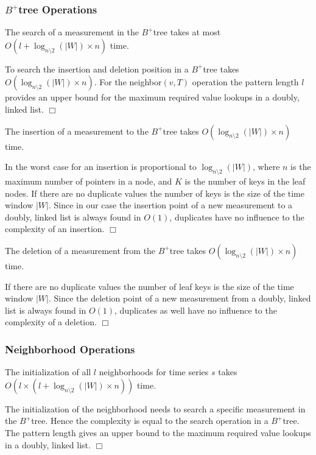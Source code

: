 \documentclass[abstracton,12pt]{scrreprt}
\newenvironment{proof}
  {\noindent{\bf Proof:\rm}}{\hfill$\Box$\vspace{\medskipamount}}
\begin{document}
\subsubsection{$B^+$tree Operations}
\begin{mydef}
	The search of a measurement in the $B^+$tree takes at most $O(l + \log_{n\setminus2}(|W|) \times n)$ time.
\end{mydef}
\begin{proof}
	To search the insertion and deletion position in a $B^+$tree takes $O(\log_{n\setminus2}(|W|) \times n)$. For the neighbor$(v,T)$ operation the pattern length $l$ provides an upper bound for the maximum required value lookups in a doubly, linked list.
\end{proof}

\begin{mydef}
	The insertion of a measurement to the $B^+$tree takes $O(\log_{n\setminus2}(|W|) \times n)$ time.
\end{mydef}
\begin{proof}
	In the worst case for an insertion is proportional to $\log_{n\setminus2}(|W|)$, where $n$ is the maximum number of pointers in a node, and $K$ is the number of keys in the leaf nodes. If there are no duplicate values the number of keys is the size of the time window $|W|$. Since in our case the insertion point of a new measurement to a doubly, linked list is always found in $O(1)$, duplicates have no influence to the complexity of an insertion.  
\end{proof}
\begin{mydef}
	The deletion of a measurement from the $B^+$tree takes $O(\log_{n\setminus2}(|W|) \times n)$ time.
\end{mydef}
\begin{proof}
	 If there are no duplicate values the number of leaf keys is the size of the time window $|W|$. Since the deletion point of a new measurement from a doubly, linked list is always found in $O(1)$, duplicates as well have no influence to the complexity of a deletion. 
\end{proof}


\subsubsection{Neighborhood Operations}
\begin{mydef}
	The initialization of all $l$ neighborhoods for time series $s$ takes  $O(l \times(l+\log_{n\setminus2}(|W|) \times n))$ time.
\end{mydef}
\begin{proof}
	The initialization of the neighborhood needs to search a specific measurement in the $B^+$tree. Hence the complexity is equal to the search operation in a $B^+$tree. The pattern length gives an upper bound to the maximum required value lookups in a doubly, linked list.
\end{proof}
\end{document}
